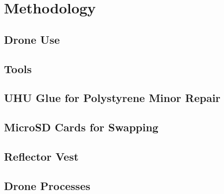 \documentclass[a4paper,12pt,twoside]{article}
\begin{document}
\section{Methodology}

\begin{multicols}{2}
\lipsum[0-5]
\end{multicols}

\subsection{Drone Use}

\begin{multicols}{2}
\lipsum[0-5]
\end{multicols}

\subsection{Tools}

\begin{multicols}{2}
\lipsum[0-5]
\end{multicols}

\subsection{UHU Glue for Polystyrene Minor Repair}

\begin{multicols}{2}
\lipsum[0-5]
\end{multicols}

\subsection{MicroSD Cards for Swapping}

\begin{multicols}{2}
\lipsum[0-5]
\end{multicols}

\subsection{Reflector Vest}

\begin{multicols}{2}
\lipsum[0-5]
\end{multicols}

\subsection{Drone Processes}
\end{document}
